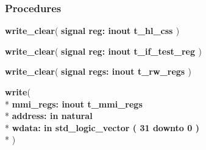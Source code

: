 \subsubsection*{Procedures}
 \begin{DoxyCompactItemize}
\item 
{\bfseries {\bfseries \textcolor{vhdlchar}{ }}} {\bf write\+\_\+clear}( {\bfseries \textcolor{keywordflow}{signal }\textcolor{vhdlchar}{reg\+: }\textcolor{stringliteral}{} {\bfseries \textcolor{keywordflow}{inout}\textcolor{vhdlchar}{ }\textcolor{vhdlchar}{t\+\_\+hl\+\_\+css}\textcolor{vhdlchar}{ }}} )
\item 
{\bfseries {\bfseries \textcolor{vhdlchar}{ }}} {\bf write\+\_\+clear}( {\bfseries \textcolor{keywordflow}{signal }\textcolor{vhdlchar}{reg\+: }\textcolor{stringliteral}{} {\bfseries \textcolor{keywordflow}{inout}\textcolor{vhdlchar}{ }\textcolor{vhdlchar}{t\+\_\+if\+\_\+test\+\_\+reg}\textcolor{vhdlchar}{ }}} )
\item 
{\bfseries {\bfseries \textcolor{vhdlchar}{ }}} {\bf write\+\_\+clear}( {\bfseries \textcolor{keywordflow}{signal }\textcolor{vhdlchar}{regs\+: }\textcolor{stringliteral}{} {\bfseries \textcolor{keywordflow}{inout}\textcolor{vhdlchar}{ }\textcolor{vhdlchar}{t\+\_\+rw\+\_\+regs}\textcolor{vhdlchar}{ }}} )
\item 
{\bfseries {\bfseries \textcolor{vhdlchar}{ }}} {\bf write}( \\*
{\bfseries \textcolor{vhdlchar}{ }\textcolor{vhdlchar}{mmi\+\_\+regs\+: }\textcolor{stringliteral}{} {\bfseries \textcolor{keywordflow}{inout}\textcolor{vhdlchar}{ }\textcolor{vhdlchar}{t\+\_\+mmi\+\_\+regs}\textcolor{vhdlchar}{ }}}\\*
  {\bfseries \textcolor{vhdlchar}{ }\textcolor{vhdlchar}{address\+: }\textcolor{stringliteral}{} {\bfseries \textcolor{keywordflow}{in}\textcolor{vhdlchar}{ }\textcolor{comment}{natural}\textcolor{vhdlchar}{ }}}\\*
  {\bfseries \textcolor{vhdlchar}{ }\textcolor{vhdlchar}{wdata\+: }\textcolor{stringliteral}{} {\bfseries \textcolor{keywordflow}{in}\textcolor{vhdlchar}{ }\textcolor{comment}{std\+\_\+logic\+\_\+vector}\textcolor{vhdlchar}{ }\textcolor{vhdlchar}{(}\textcolor{vhdlchar}{ }\textcolor{vhdlchar}{ } \textcolor{vhdldigit}{31} \textcolor{vhdlchar}{ }\textcolor{keywordflow}{downto}\textcolor{vhdlchar}{ }\textcolor{vhdlchar}{ } \textcolor{vhdldigit}{0} \textcolor{vhdlchar}{ }\textcolor{vhdlchar}{)}\textcolor{vhdlchar}{ }}}\\*
   )
\end{DoxyCompactItemize}


